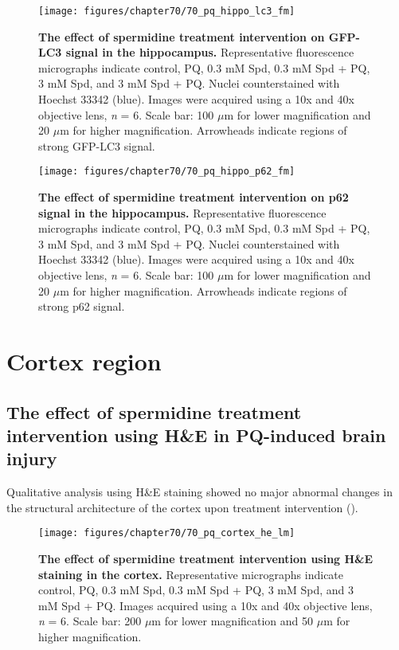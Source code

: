 \begin{landscape}
\begin{figure}[!htbp]
\center
  \texttt{[image: figures/chapter70/70\_pq\_hippo\_lc3\_fm]}
  \caption[The effect of spermidine treatment intervention on GFP-LC3 signal in the hippocampus]{\textbf{The effect of spermidine treatment  intervention on GFP-LC3 signal in the hippocampus.} Representative fluorescence micrographs indicate control, PQ, 0.3 mM Spd, 0.3 mM Spd + PQ, 3 mM Spd, and 3 mM Spd + PQ. Nuclei counterstained with Hoechst 33342 (blue). Images were acquired using a 10x and 40x objective lens, \textit{n} = 6. Scale bar: 100 $\mu$m for lower magnification and 20 $\mu$m for higher magnification. Arrowheads indicate regions of strong GFP-LC3 signal.}
  \label{fig:70_pq_hippo_lc3_fm}
\end{figure} 
\end{landscape}

\begin{landscape}
\begin{figure}[!htbp]
\center
  \texttt{[image: figures/chapter70/70\_pq\_hippo\_p62\_fm]}
  \caption[The effect of spermidine treatment intervention on p62 signal in the hippocampus]{\textbf{The effect of spermidine treatment intervention on p62 signal in the hippocampus.} Representative fluorescence micrographs indicate control, PQ, 0.3 mM Spd, 0.3 mM Spd + PQ, 3 mM Spd, and 3 mM Spd + PQ. Nuclei counterstained with Hoechst 33342 (blue). Images were acquired using a 10x and 40x objective lens, \textit{n} = 6. Scale bar: 100 $\mu$m for lower magnification and 20 $\mu$m for higher magnification. Arrowheads indicate regions of strong p62 signal.}
  \label{fig:70_pq_hippo_p62_fm}
\end{figure} 
\end{landscape}

\section{Cortex region}
\subsection{The effect of spermidine treatment intervention using H\&E in PQ-induced brain injury}
Qualitative analysis using H\&E staining showed no major abnormal changes in the structural architecture of the cortex upon treatment intervention ().

\begin{figure}[!htbp]
\center
  \texttt{[image: figures/chapter70/70\_pq\_cortex\_he\_lm]}
  \caption[The effect of spermidine treatment intervention using H\&E staining in the cortex]{\textbf{The effect of spermidine treatment intervention using H\&E staining in the cortex.} Representative micrographs indicate control, PQ, 0.3 mM Spd, 0.3 mM Spd + PQ, 3 mM Spd, and 3 mM Spd + PQ. Images acquired using a 10x and 40x objective lens, \textit{n} = 6. Scale bar: 200 $\mu$m for lower magnification and 50 $\mu$m for higher magnification.}
  \label{fig:70_pq_cortex_he_lm}
\end{figure} 

